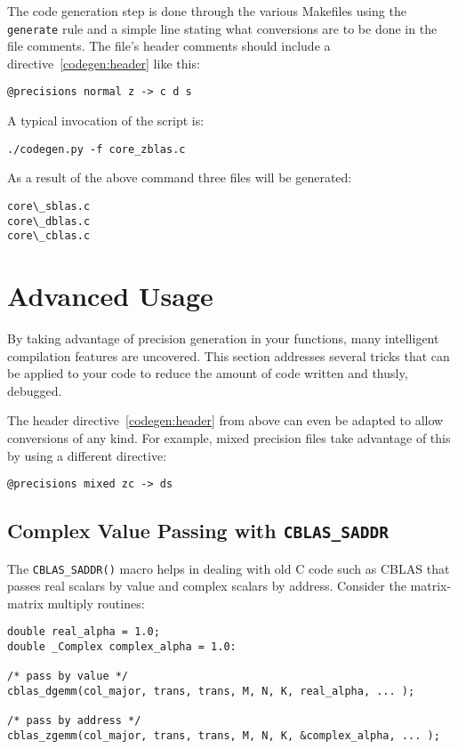 The code generation step is done through the various Makefiles using
the \texttt{generate} rule and a simple line stating what conversions 
are to be done in the file comments.  The file's header comments should include a
directive~\ref{codegen:header} like this:
\begin{verbatim}
@precisions normal z -> c d s
\end{verbatim}
A typical invocation of the script is:
\begin{verbatim}
./codegen.py -f core_zblas.c
\end{verbatim}
As a result of the above command three files will be generated:
\begin{verbatim}
core\_sblas.c
core\_dblas.c
core\_cblas.c
\end{verbatim}

\section{Advanced Usage}
By taking advantage of precision generation in your functions, many intelligent compilation
features are uncovered.  This section addresses several tricks that can be applied to your code
to reduce the amount of code written and thusly, debugged.

The header directive~\ref{codegen:header} from above can even be adapted to allow conversions of any kind.  For example,
mixed precision files take advantage of this by using a different directive:
\begin{verbatim}
@precisions mixed zc -> ds
\end{verbatim}

\subsection{Complex Value Passing with \texttt{CBLAS\_SADDR}}
The \texttt{CBLAS\_SADDR()} macro helps in dealing with old C code such as CBLAS that
passes real scalars by value and complex scalars by address. Consider the matrix-matrix
multiply routines:
\begin{verbatim}
double real_alpha = 1.0;
double _Complex complex_alpha = 1.0:

/* pass by value */
cblas_dgemm(col_major, trans, trans, M, N, K, real_alpha, ... );

/* pass by address */
cblas_zgemm(col_major, trans, trans, M, N, K, &complex_alpha, ... );
\end{verbatim}

